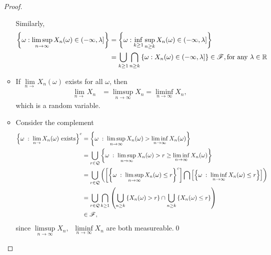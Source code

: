 \documentclass[11pt]{article}
\begin{document}
\begin{itemize}
\begin{proof}
\begin{itemize}
Similarly,  
\begin{align*}
\left\{\omega: \limsup\limits_{n\rightarrow \infty}X_{n}(\omega)\in (-\infty, \lambda] \right\}&= \left\{\omega: \inf\limits_{k\ge 1}\sup_{n\ge k} X_{n}(\omega) \in (-\infty, \lambda] \right\}\\
&= \bigcup_{k\ge 1}\bigcap_{n\ge k}\left\{\omega: X_{n}(\omega)\in (-\infty, \lambda] \right\} \in {\mathscr F}, \text{for any }\lambda \in {\mathbb R}
\end{align*}


\item If $\lim\limits_{n\rightarrow}X_{n}(\omega)$ exists for all $\omega$, then
\begin{align*}
\lim\limits_{n\rightarrow}X_{n} &=  \limsup\limits_{n\rightarrow \infty}X_{n} = \liminf\limits_{n\rightarrow \infty}X_{n},
\end{align*}
which is a random variable.\\

\item Consider the complement
\begin{align*}
\left\{\omega\;:\; \lim\limits_{n\rightarrow}X_{n}(\omega) \text{ exists} \right\}^{c}
&= \left\{ \omega\;:\; \limsup\limits_{n\rightarrow \infty}X_{n}(\omega) >  \liminf\limits_{n\rightarrow \infty}X_{n}(\omega)\right\}\\
&=  \bigcup_{r\in {\mathcal Q}}\left\{ \omega\;:\; \limsup\limits_{n\rightarrow \infty}X_{n}(\omega) > r\ge   \liminf\limits_{n\rightarrow \infty}X_{n}(\omega)\right\}\\
&= \bigcup_{r\in {\mathcal Q}}\left(\left[\left\{ \omega\;:\; \limsup\limits_{n\rightarrow \infty}X_{n}(\omega) \le r\right\}^{c}\right]\bigcap\left[\left\{ \omega\;:\; \liminf\limits_{n\rightarrow \infty}X_{n}(\omega) \le r\right\}\right]\right) \\
&= \bigcup_{r\in {\mathcal Q}} \bigcap_{k\ge 1}\left(\bigcup_{n\ge k}\left\{X_{n}(\omega) > r\right\}\cap\bigcup_{n\ge k}\left\{X_{n}(\omega) \le r\right\}   \right)\\
&\in {\mathscr F}, 
\end{align*}
since $\limsup\limits_{n\rightarrow \infty}X_{n} , \;\; \liminf\limits_{n\rightarrow \infty}X_{n}$ are both measureable.\qed
\end{itemize}
\end{proof}
\end{itemize}
\end{document}
